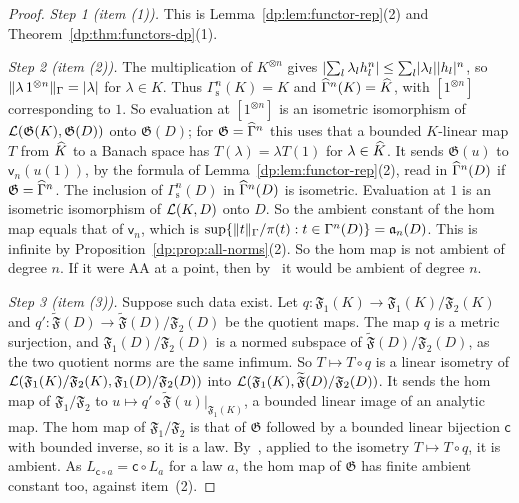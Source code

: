 \begin{proof}
\emph{Step 1 (item (1)).} This is Lemma~\ref{dp:lem:functor-rep}(2) and Theorem~\ref{dp:thm:functors-dp}(1).

\emph{Step 2 (item (2)).} The multiplication of $K^{\otimes n}$ gives $\lvert \sum_l\lambda_lh_l^n\rvert\le\sum_l\lvert \lambda_l\rvert\lvert h_l\rvert^n$, so $\lVert \lambda\,1^{\otimes n}\rVert_\Gamma=\lvert \lambda\rvert$ for $\lambda\in K$. Thus $\Gamma^n_{\mathrm s}(K)=K$ and $\widehat\Gamma^n(K)=\widehat K$, with $[1^{\otimes n}]$ corresponding to $1$. So evaluation at $[1^{\otimes n}]$ is an isometric isomorphism of $\mathcal L(\mathfrak G(K),\mathfrak G(D))$ onto $\mathfrak G(D)$; for $\mathfrak G=\widehat\Gamma^n$ this uses that a bounded $K$-linear map $T$ from $\widehat K$ to a Banach space has $T(\lambda)=\lambda T(1)$ for $\lambda\in\widehat K$. It sends $\mathfrak G(u)$ to $\mathsf v_n(u(1))$, by the formula of Lemma~\ref{dp:lem:functor-rep}(2), read in $\widehat\Gamma^n(D)$ if $\mathfrak G=\widehat\Gamma^n$. The inclusion of $\Gamma^n_{\mathrm s}(D)$ in $\widehat\Gamma^n(D)$ is isometric. Evaluation at $1$ is an isometric isomorphism of $\mathcal L(K,D)$ onto $D$. So the ambient constant of the hom map equals that of $\mathsf v_n$, which is $\sup\{\lVert t\rVert_\Gamma/\pi(t):t\in\Gamma^n(D)\}=\mathfrak a_n(D)$. This is infinite by Proposition~\ref{dp:prop:all-norms}(2). So the hom map is not ambient of degree $n$. If it were AA at a point, then by~\cite[Proposition~14.9(2)]{I} it would be ambient of degree $n$.

\emph{Step 3 (item (3)).} Suppose such data exist. Let $q\colon\mathfrak F_1(K)\to\mathfrak F_1(K)/\mathfrak F_2(K)$ and $q'\colon\widetilde{\mathfrak F}(D)\to\widetilde{\mathfrak F}(D)/\mathfrak F_2(D)$ be the quotient maps. The map $q$ is a metric surjection, and $\mathfrak F_1(D)/\mathfrak F_2(D)$ is a normed subspace of $\widetilde{\mathfrak F}(D)/\mathfrak F_2(D)$, as the two quotient norms are the same infimum. So $T\mapsto T\circ q$ is a linear isometry of $\mathcal L(\mathfrak F_1(K)/\mathfrak F_2(K),\mathfrak F_1(D)/\mathfrak F_2(D))$ into $\mathcal L(\mathfrak F_1(K),\widetilde{\mathfrak F}(D)/\mathfrak F_2(D))$. It sends the hom map of $\mathfrak F_1/\mathfrak F_2$ to $u\mapsto q'\circ\widetilde{\mathfrak F}(u)|_{\mathfrak F_1(K)}$, a bounded linear image of an analytic map. The hom map of $\mathfrak F_1/\mathfrak F_2$ is that of $\mathfrak G$ followed by a bounded linear bijection $\mathsf c$ with bounded inverse, so it is a law. By~\cite[Proposition~14.9(2)]{I}, applied to the isometry $T\mapsto T\circ q$, it is ambient. As $L_{\mathsf c\circ a}=\mathsf c\circ L_a$ for a law $a$, the hom map of $\mathfrak G$ has finite ambient constant too, against item~(2).
\end{proof}

